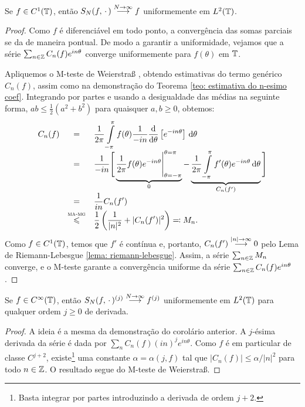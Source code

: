 \documentclass[../main.tex]{subfiles}
\begin{document}
\begin{corolario}
    Se $f\in C^1(\mathbb T)$, então $S_N(f, \operatorname{\,\cdot\,}) \overset{N\to\infty}{\longrightarrow} f$ uniformemente em $L ^2(\mathbb T)$.
    \begin{proof}
        Como $f$ é diferenciável em todo ponto, a convergência das somas parciais se da de maneira pontual. De modo a garantir a uniformidade, vejamos que a série $\sum_{n\in\operatorname{\mathbb{Z}}} C_n(f) e^{in\theta}$ converge uniformemente para $f(\theta)$ em $\mathbb T$.
        
        Apliquemos o M-teste de Weierstra\ss\,\,\cite[Theorem 7.10]{rudin1976principles}, obtendo estimativas do termo genérico $C_n(f)$, assim como na demonstração do Teorema \ref{teo: estimativa do n-esimo coef}. Integrando por partes e usando a desigualdade das médias na seguinte forma, $ab \leqslant \frac12(a^2 +b^2)$ para quaisquer $a,b \geqslant 0$, obtemos:
        \begin{equation*}
            \begin{array}{rcl}
                C_n(f) &=& \displaystyle \dfrac{1}{2\pi} \int\limits_{-\pi}^\pi f(\theta) \dfrac{1}{-in} \dfrac{{\operatorname{d}}{}}{{\operatorname{d}}{\theta}}\left[e^{-in\theta}\right] \,{\operatorname{d}}{\theta}\\
                &=& \displaystyle \dfrac1{-in} \Bigg[\underbrace{\dfrac1{2\pi} f(\theta) e^{-in\theta}\Bigg|^{\theta= \pi}_{\theta= -\pi}}_0 -  \underbrace{\dfrac{1}{2\pi}\int\limits_{-\pi}^\pi f'(\theta)e^{-in\theta}\,{\operatorname{d}}{\theta}}_{C_n(f')} \Bigg]\\
                &=& \displaystyle \dfrac1{in} C_n(f')\\
                &\overset{\textsc{ma-mg}}\leqslant& \vphantom{\int\limits^b}\displaystyle \dfrac12 \left(\dfrac1{|n|^2}  + |C_n(f')|^2\right) \eqqcolon M_n.
            \end{array}
        \end{equation*}
        Como $f\in C^1(\mathbb T)$, temos que $f'$ é contínua e, portanto, $C_n(f') \overset{|n|\to \infty}{\longrightarrow} 0$ pelo Lema de Riemann-Lebesgue \ref{lema: riemann-lebesgue}. Assim, a série $\sum_{n\in\operatorname{\mathbb{Z}}} M_n$ converge, e o M-teste garante a convergência uniforme da série $\sum_{n\in\operatorname{\mathbb{Z}}} C_n(f) e^{in\theta}$.
    \end{proof}
\end{corolario}

\begin{corolario}
    Se $f\in C^\infty(\mathbb T)$, então $S_N(f, \operatorname{\,\cdot\,})^{(j)} \overset{N\to\infty}{\longrightarrow} f^{(j)}$ uniformemente em $L^2(\mathbb T)$ para qualquer ordem $j\geqslant 0$ de derivada.

    \begin{proof}
        A ideia é a mesma da demonstração do corolário anterior. A $j$-ésima derivada da série é dada por $\sum_n C_n(f) (in)^j e^{in\theta}$. Como $f$ é em particular de classe $C^{j+2}$, existe\footnote{Basta integrar por partes introduzindo a derivada de ordem $j+2$.} uma constante $\alpha = \alpha(j, f)$ tal que $|C_n(f)| \leqslant \alpha/|n|^2$ para todo $n\in \operatorname{\mathbb{Z}}$. O resultado segue do M-teste de Weierstra\ss.
    \end{proof}
\end{corolario}
\end{document}
